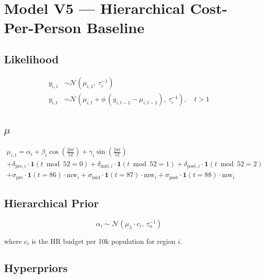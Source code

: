 \documentclass{article}
\begin{document}
\section*{Model V5 --- Hierarchical Cost-Per-Person Baseline}

\subsection*{Likelihood}

\begin{align}
  y_{i,1} &\sim \mathcal{N}(\mu_{i,1},\ \tau_i^{-1}) \\[6pt]
  y_{i,t} &\sim \mathcal{N}\left(\mu_{i,t} + \phi\,(y_{i,t-1} - \mu_{i,t-1}),\ \tau_i^{-1}\right), \quad t > 1
\end{align}

\subsection*{$\mu$}

\begin{multline}
  \mu_{i,t} = \alpha_i
    + \beta_i \cos\left(\tfrac{2\pi t}{52}\right)
    + \gamma_i \sin\left(\tfrac{2\pi t}{52}\right) \\
    + \delta_{\text{pre},i} \cdot \mathbf{1}(t \bmod 52 = 0)
    + \delta_{\text{mid},i} \cdot \mathbf{1}(t \bmod 52 = 1)
    + \delta_{\text{post},i} \cdot \mathbf{1}(t \bmod 52 = 2) \\
    + \sigma_{\text{pre}} \cdot \mathbf{1}(t = 86) \cdot \mathrm{mw}_i
    + \sigma_{\text{mid}} \cdot \mathbf{1}(t = 87) \cdot \mathrm{mw}_i
    + \sigma_{\text{post}} \cdot \mathbf{1}(t = 88) \cdot \mathrm{mw}_i
\end{multline}

\subsection*{Hierarchical Prior}

\begin{equation}
  \alpha_i \sim \mathcal{N}(\mu_\lambda \cdot c_i,\ \tau_\alpha^{-1})
\end{equation}

where $c_i$ is the HR budget per 10k population for region $i$.

\subsection*{Hyperpriors}
\end{document}
